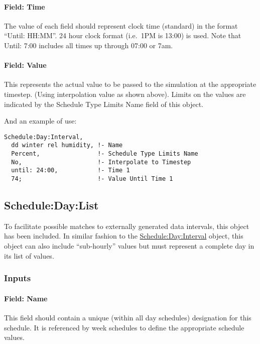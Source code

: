 \paragraph{Field: Time}\label{field-time}

The value of each field should represent clock time (standard) in the format ``Until: HH:MM''. 24 hour clock format (i.e.~1PM is 13:00) is used. Note that Until: 7:00 includes all times up through 07:00 or 7am.

\paragraph{Field: Value}\label{field-value}

This represents the actual value to be passed to the simulation at the appropriate timestep. (Using interpolation value as shown above). Limits on the values are indicated by the Schedule Type Limits Name field of this object.

And an example of use:

\begin{lstlisting}
Schedule:Day:Interval,
  dd winter rel humidity, !- Name
  Percent,                !- Schedule Type Limits Name
  No,                     !- Interpolate to Timestep
  until: 24:00,           !- Time 1
  74;                     !- Value Until Time 1
\end{lstlisting}

\subsection{Schedule:Day:List}\label{scheduledaylist}

To facilitate possible matches to externally generated data intervals, this object has been included. In similar fashion to the \hyperref[scheduledayinterval]{Schedule:Day:Interval} object, this object can also include ``sub-hourly'' values but must represent a complete day in its list of values.

\subsubsection{Inputs}\label{inputs-3-032}

\paragraph{Field: Name}\label{field-name-3-028}

This field should contain a unique (within all day schedules) designation for this schedule. It is referenced by week schedules to define the appropriate schedule values.

